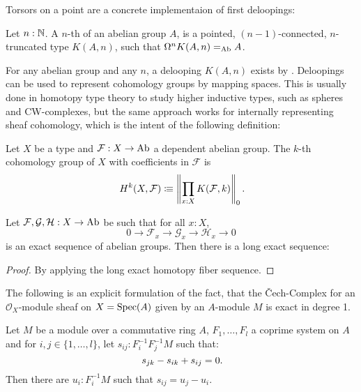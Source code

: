 Torsors on a point are a concrete implementaion of first deloopings:

\begin{definition}
  \label{delooping}
  Let $n:\mathbb{N}$.
  A $n$-th  of an abelian group $A$,
  is a pointed, $(n-1)$-connected, $n$-truncated type $K(A,n)$,
  such that $\Omega^nK(A,n)=_{\operatorname{Ab}}A$.
\end{definition}

For any abelian group and any $n$, a delooping $K(A,n)$ exists by \cite{licata-finster}.
Deloopings can be used to represent cohomology groups by mapping spaces.
This is usually done in homotopy type theory to study higher inductive types, such as spheres and CW-complexes,
but the same approach works for internally representing sheaf cohomology,
which is the intent of the following definition:

\begin{definition}
  \label{cohomology}
  Let $X$ be a type and $\mathcal F:X\to\operatorname{Ab}$ a dependent abelian group.
  The $k$-th cohomology group of $X$ with coefficients in $\mathcal F$ is
  \[
    H^k(X,\mathcal F)\colonequiv \left\|\prod_{x:X}K(\mathcal F,k)\right\|_0\rlap{.}
  \]
\end{definition}

\begin{theorem}%
  \label{cohomology-les}
  Let $\mathcal F,\mathcal G,\mathcal H:X\to \operatorname{Ab}$ be such that for all $x:X$,
  \[
    0\to \mathcal F_x\to\mathcal G_x\to\mathcal H_x\to 0
  \]
  is an exact sequence of abelian groups. Then there is a long exact sequence:
  \begin{center}
  \end{center}
\end{theorem}

\begin{proof}
  By applying the long exact homotopy fiber sequence.
\end{proof}

The following is an explicit formulation of the fact, that the Čech-Complex for an
$\mathcal{O}_X$-module sheaf on $X=\operatorname{Spec}(A)$ given by an $A$-module $M$ is exact in degree 1.
\begin{lemma}%
  \label{H1-algebra}
  Let $M$ be a module over a commutative ring $A$, $F_1,\dots,F_l$ a coprime system on $A$
  and for $i,j\in\{1,\dots,l\}$, let $s_{ij} : F_i^{-1} F_j^{-1} M$ such that:
  \[ s_{jk}-s_{ik}+s_{ij}=0 \rlap{.}\]
  Then there are $u_i:F_i^{-1}M$ such that $s_{ij}=u_j - u_i$.
\end{lemma}

